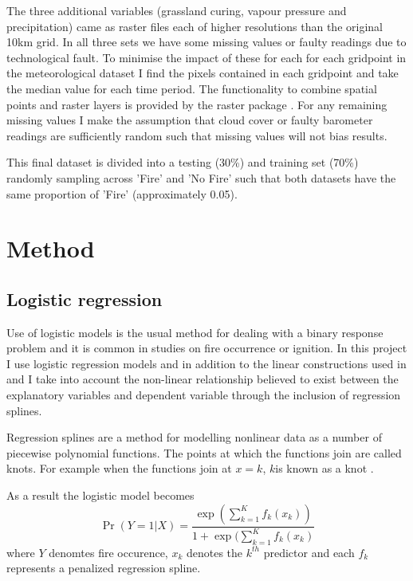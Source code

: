 \documentclass{article}
\begin{document}
The three additional variables (grassland curing, vapour pressure and precipitation) came as raster files each of higher resolutions than the original 10km grid. In all three sets we have some missing values or faulty readings due to technological fault. To minimise the impact of these for each for each gridpoint in the meteorological dataset I find the pixels contained in each gridpoint and take the median value for each time period. The functionality to combine spatial points and raster layers is provided by the raster package \citep{raster}. For any remaining missing values I make the assumption that cloud cover or faulty barometer readings are sufficiently random such that missing values will not bias results.
 

This final dataset is divided into a testing (30\%) and training set (70\%) randomly sampling across 'Fire' and 'No Fire' such that both datasets have the same proportion of 'Fire' (approximately 0.05). 

\section{Method}

\subsection{Logistic regression}

Use of logistic models is the usual method for dealing with a binary response problem and it is common in studies on fire occurrence or ignition.  In this project I use logistic regression models and in addition to the linear constructions used in \citet{andrews03} and \citet{del11} I take into account the non-linear relationship believed to exist between the explanatory variables and dependent variable through the inclusion of regression splines. 

Regression splines are a method for modelling nonlinear data as a number of piecewise  polynomial functions. The points at which the functions join are called knots. For example when the functions join at $x=k$, $k$is known as a knot \citep{ruppert03}.

As a result the logistic model becomes
\begin{equation}
\label{eq logits}
\Pr(Y=1|X)=\frac{\exp(\sum_{k=1}^K f_k(x_k))}{1+\exp(\sum_{k=1}^K f_k(x_k)}
\end{equation}
where $Y$ denomtes fire occurence, $x_k$ denotes the $k^{th}$ predictor and each $f_k$ represents a penalized regression spline.
\end{document}
